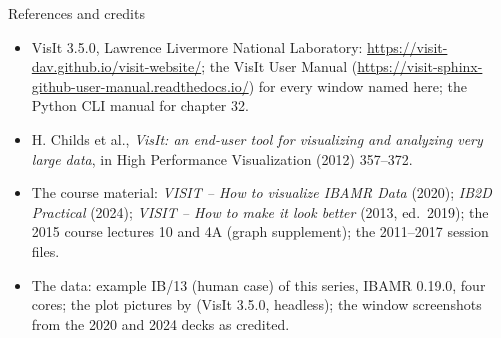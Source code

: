 \documentclass[aspectratio=169,11pt]{beamer}
\begin{document}
\begin{frame}{References and credits}
\label{fr:refs}
\scriptsize
\begin{itemize}
  \item VisIt 3.5.0, Lawrence Livermore National Laboratory: \url{https://visit-dav.github.io/visit-website/}; the VisIt User Manual (\url{https://visit-sphinx-github-user-manual.readthedocs.io/}) for every window named here; the Python CLI manual for chapter 32.
  \item H. Childs et al., \emph{VisIt: an end-user tool for visualizing and analyzing very large data}, in High Performance Visualization (2012) 357--372.
  \item The course material: \emph{VISIT -- How to visualize IBAMR Data} (2020); \emph{IB2D Practical} (2024); \emph{VISIT -- How to make it look better} (2013, ed.\ 2019); the 2015 course lectures 10 and 4A (graph supplement); the 2011--2017 session files.
  \item The data: example IB/13 (human case) of this series, IBAMR 0.19.0, four cores; the plot pictures by  (VisIt 3.5.0, headless); the window screenshots from the 2020 and 2024 decks as credited.
\end{itemize}
\end{frame}
\end{document}
